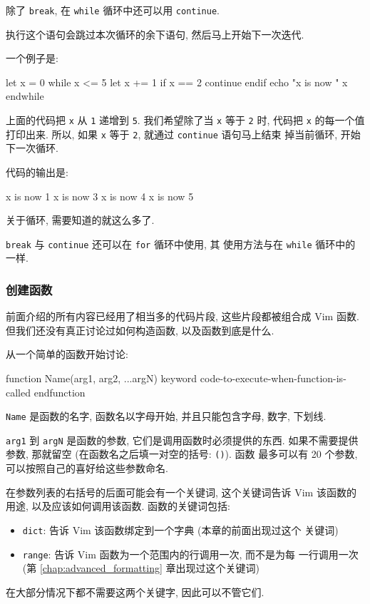 除了 \texttt{break}, 在 \texttt{while} 循环中还可以用 \texttt{continue}.

执行这个语句会跳过本次循环的余下语句, 然后马上开始下一次迭代.

一个例子是:
\begin{vimcode}
let x = 0
while x <= 5
    let x += 1
    if x ==  2
        continue
    endif
    echo "x is now " x
endwhile
\end{vimcode}
上面的代码把 \texttt{x} 从 \texttt{1} 递增到 \texttt{5}. 我们希望除了当
\texttt{x} 等于 \texttt{2} 时, 代码把 \texttt{x} 的每一个值打印出来. 所以,
如果 \texttt{x} 等于 \texttt{2}, 就通过 \texttt{continue} 语句马上结束
掉当前循环, 开始下一次循环.

代码的输出是:
\begin{vimcode}
x is now 1
x is now 3
x is now 4
x is now 5
\end{vimcode}
关于循环, 需要知道的就这么多了.

\begin{warning}
    \texttt{break} 与 \texttt{continue} 还可以在 \texttt{for} 循环中使用, 其
    使用方法与在 \texttt{while} 循环中的一样.
\end{warning}

\subsubsection{创建函数}
\label{subsubsec:creating_functions}

前面介绍的所有内容已经用了相当多的代码片段, 这些片段都被组合成 Vim
函数. 但我们还没有真正讨论过如何构造函数, 以及函数到底是什么.

从一个简单的函数开始讨论:
\begin{vimcode}
function Name(arg1, arg2, ...argN) keyword
    code-to-execute-when-function-is-called
endfunction
\end{vimcode}
\texttt{Name} 是函数的名字, 函数名以字母开始, 并且只能包含字母, 数字, 下划线.

\texttt{arg1} 到 \texttt{argN} 是函数的参数, 它们是调用函数时必须提供的东西.
如果不需要提供参数, 那就留空 (在函数名之后填一对空的括号: \texttt{()}). 函数
最多可以有 20 个参数, 可以按照自己的喜好给这些参数命名.

在参数列表的右括号的后面可能会有一个关键词, 这个关键词告诉 Vim 该函数的用途,
以及应该如何调用该函数. 函数的关键词包括:
\begin{itemize}
    \item \texttt{dict}: 告诉 Vim 该函数绑定到一个字典 (本章的前面出现过这个
        关键词)
    \item \texttt{range}: 告诉 Vim 函数为一个范围内的行调用一次, 而不是为每
        一行调用一次 (第 \ref{chap:advanced_formatting} 章出现过这个关键词)
\end{itemize}
在大部分情况下都不需要这两个关键字, 因此可以不管它们.

